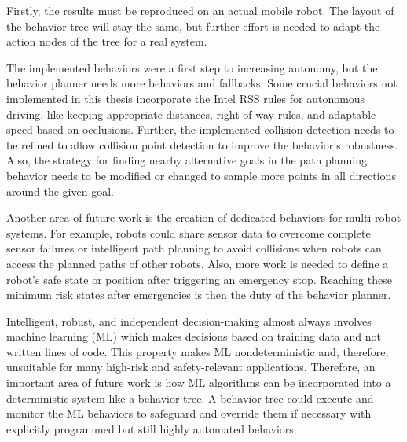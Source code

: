 Firstly, the results must be reproduced on an actual mobile robot. The layout of the behavior tree will stay the same, but further effort is needed to adapt the action nodes of the tree for a real system. 

The implemented behaviors were a first step to increasing autonomy, but the behavior planner needs more behaviors and fallbacks. Some crucial behaviors not implemented in this thesis incorporate the Intel RSS rules for autonomous driving, like keeping appropriate distances, right-of-way rules, and adaptable speed based on occlusions. Further, the implemented collision detection needs to be refined to allow collision point detection to improve the behavior's robustness. Also, the strategy for finding nearby alternative goals in the path planning behavior needs to be modified or changed to sample more points in all directions around the given goal. 

Another area of future work is the creation of dedicated behaviors for multi-robot systems. For example, robots could share sensor data to overcome complete sensor failures or intelligent path planning to avoid collisions when robots can access the planned paths of other robots. 
Also, more work is needed to define a robot's safe state or position after triggering an emergency stop. Reaching these minimum risk states after emergencies is then the duty of the behavior planner.

Intelligent, robust, and independent decision-making almost always involves machine learning (ML) which makes decisions based on training data and not written lines of code. This property makes ML nondeterministic and, therefore, unsuitable for many high-risk and safety-relevant applications. Therefore, an important area of future work is how ML algorithms can be incorporated into a deterministic system like a behavior tree. A behavior tree could execute and monitor the ML behaviors to safeguard and override them if necessary with explicitly programmed but still highly automated behaviors.
